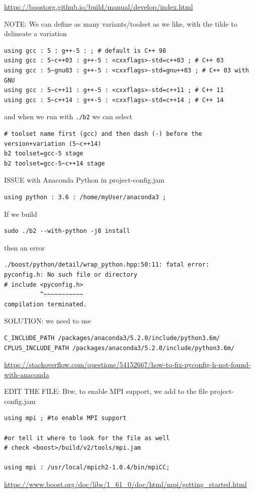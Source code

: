 \url{https://boostorg.github.io/build/manual/develop/index.html}

NOTE: We can define as many variants/toolset as we like, with the tilde to delineate a variation
\begin{verbatim}
using gcc : 5 : g++-5 : ; # default is C++ 98
using gcc : 5~c++03 : g++-5 : <cxxflags>-std=c++03 ; # C++ 03
using gcc : 5~gnu03 : g++-5 : <cxxflags>-std=gnu++03 ; # C++ 03 with GNU
using gcc : 5~c++11 : g++-5 : <cxxflags>-std=c++11 ; # C++ 11
using gcc : 5~c++14 : g++-5 : <cxxflags>-std=c++14 ; # C++ 14
\end{verbatim}

and when we run with \verb!./b2! we can select 
\begin{verbatim}
# toolset name first (gcc) and then dash (-) before the version+variation (5~c++14)
b2 toolset=gcc-5 stage
b2 toolset=gcc-5~c++14 stage
\end{verbatim}

ISSUE with Anaconda Python in project-config.jam
\begin{verbatim}
using python : 3.6 : /home/myUser/anaconda3 ; 

\end{verbatim}
If we build
\begin{verbatim}
sudo ./b2 --with-python -j8 install
\end{verbatim}
then an error
\begin{verbatim}
./boost/python/detail/wrap_python.hpp:50:11: fatal error: 
pyconfig.h: No such file or directory
# include <pyconfig.h>
          ^~~~~~~~~~~~
compilation terminated.
\end{verbatim}
SOLUTION: we need to use
\begin{verbatim}
C_INCLUDE_PATH /packages/anaconda3/5.2.0/include/python3.6m/
CPLUS_INCLUDE_PATH /packages/anaconda3/5.2.0/include/python3.6m/
\end{verbatim}
\url{https://stackoverflow.com/questions/54152667/how-to-fix-pyconfig-h-not-found-with-anaconda}

EDIT THE FILE: Btw, to enable MPI support, we add to the file project-config.jam
\begin{verbatim}
using mpi ; #to enable MPI support

#or tell it where to look for the file as well
# check <boost>/build/v2/tools/mpi.jam

using mpi : /usr/local/mpich2-1.0.4/bin/mpiCC;
\end{verbatim}
\url{https://www.boost.org/doc/libs/1_61_0/doc/html/mpi/getting_started.html}


